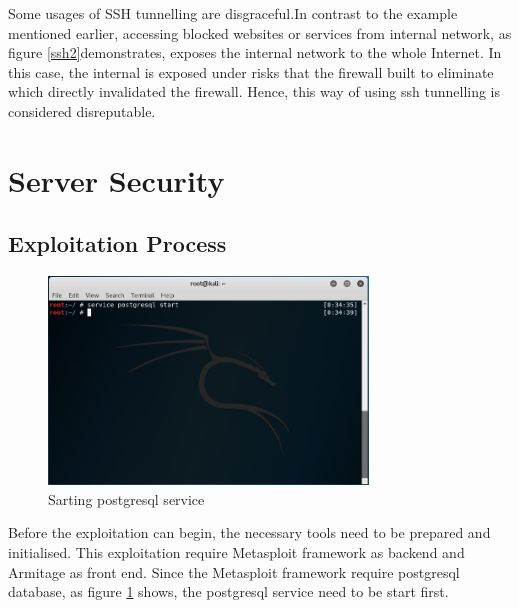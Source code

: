 \documentclass{article}
\begin{document}
Some usages of SSH tunnelling are disgraceful.In contrast to the example mentioned 
earlier, accessing blocked websites or services from internal network, 
as figure \ref{ssh2}demonstrates, exposes the internal network to the whole Internet. 
In this case, the internal is exposed under risks that the firewall built to eliminate which directly 
invalidated the firewall. Hence, this way of using ssh tunnelling is considered disreputable. 

\section{Server Security}
\label{sec:serversec}






\subsection{Exploitation Process}
\begin{figure}[H]
  \includegraphics[width=8.5cm]{kali1}
  \caption{Sarting postgresql service}
  \label{kali1}
\end{figure}

Before the exploitation can begin, the necessary tools need to be prepared and initialised.
This exploitation require Metasploit framework as backend and Armitage as front end. Since the 
Metasploit framework require postgresql database, as figure \ref{kali1} shows, 
the postgresql service need to be start first.
\end{document}
